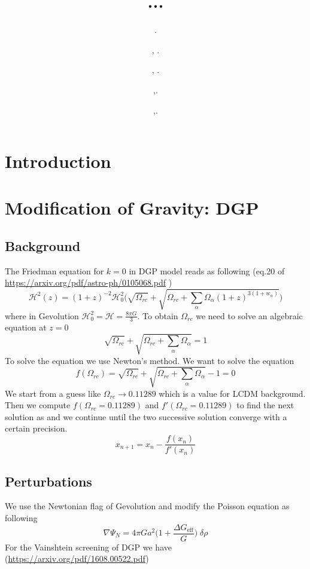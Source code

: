 \documentclass[a4paper,10pt]{article}
\title{... }
\author[a]{.}
\author[b]{, .}
\author[c]{, .}
\author[d]{,.}
\author[e]{,.}
\def\be{\begin{equation}}
\def\ee{\end{equation}}
\newcommand{\HH}{\mathcal H}
\begin{document}
\maketitle
\section{Introduction}
\section{Modification of Gravity: DGP }
\subsection{Background}
The Friedman equation for $k=0$ in DGP model reads as following (eq.20 of \url{https://arxiv.org/pdf/astro-ph/0105068.pdf} )
\be
\mathcal{H}^2 (z) = (1+z)^{-2} \HH_0^2 \Bigg(\sqrt{\Omega_{rc}} + \sqrt{\Omega_{rc} + \sum_{\alpha} \Omega_{\alpha} (1+z)^{3 (1+w_{\alpha})} }  \Bigg)
\ee
where in Gevolution $\HH_0^2 = \HH = \frac{8\pi G}{3}$. To obtain $\Omega_{rc}$ we need to solve an algebraic equation at $z=0$
\be
 \sqrt{\Omega_{rc}} + \sqrt{\Omega_{rc} + \sum_{\alpha} \Omega_{\alpha} }  =1
\ee
To solve the equation we use Newton's method. We want to solve the equation
 \be
 f(\Omega_{rc})= \sqrt{\Omega_{rc}} + \sqrt{\Omega_{rc} + \sum_{\alpha} \Omega_{\alpha} }   -1 =0 
 \ee
 We start from a guess like $\Omega_{rc} \to 0.11289$ which is a value for LCDM background. Then we compute $f(\Omega_{rc} =0.11289 )$ and $f'(\Omega_{rc} =0.11289 )$ to find the next solution as and we continue until the two successive solution converge with a certain precision.
 \be
 x_{n+1} = x_n - \frac{f(x_n)}{f'(x_n)}
 \ee

\subsection{Perturbations}
We use the Newtonian flag of Gevolution  and modify the Poisson equation as following
 \be
\nabla \Psi_N = 4 \pi G{a^2} \Big(1+ \frac{\Delta G_{\text{eff}}}{G} \Big)\; \delta \rho
  \ee
  For the Vainshtein screening of DGP we have (\url{https://arxiv.org/pdf/1608.00522.pdf})
  
\end{document}
